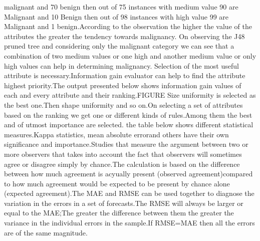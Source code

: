 \documentclass[11pt]{article}
\begin{document}
malignant and 70%
benign then out of 75 instances with medium value 90%
are Malignant and 10%
Benign then out of 98 instances with high value 99%
are Malignant and 1%
benign.According to the observation  the higher the value of the attributes the greater the tendency towards malignancy.
On observing the J48 pruned tree and considering only the malignant category  we can see that a combination of two medium values or one high and another medium value or only high values can help in determining malignancy.
Selection of the most useful attribute is necessary.Information gain evaluator can help to find the attribute highest priority.The output presented below shows information gain values of each and every attribute and their ranking.FIGURE Size uniformity is selected as the best one.Then shape uniformity and so on.On selecting a set of attributes based on the ranking we get one or different kinds of rules.Among them the best and of utmost importance are selected.
the table below shows different statistical measures.Kappa statistics,
mean absolute errorand others have their own significance and importance.Studies that measure the argument between two or more observers that takes into account the fact that observers will sometimes agree or disagree simply by chance.The calculation is based on the difference between how much agreement is acyually present (observed agreement)compared to how much agreement would be expected to be  present by chance alone (expected agreement).The MAE and RMSE can be used together to diagnose the variation in the errors in a set of forecasts.The RMSE will always be larger or equal to the MAE;The greater the difference between them  the greater the variance in the individual errors in the sample.If RMSE=MAE then all the errors are of the same magnitude.
\end{document}
